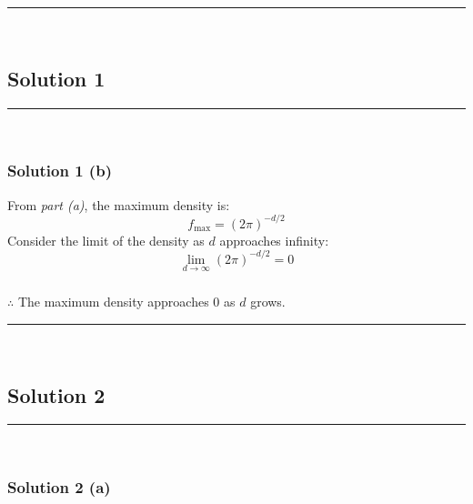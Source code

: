 \documentclass{article}
\begin{document}
\noindent\rule{\textwidth}{0.4pt}\\

\newpage

\subsection*{Solution 1}
\noindent\rule{\textwidth}{0.4pt}\\
\subsubsection*{Solution 1 (b)}
From \textit{part (a)}, the maximum density is:
$$f_{\text{max}} = (2\pi)^{-d/2}$$
Consider the limit of the density as $d$ approaches infinity:
$$ \lim_{d \to \infty} (2\pi)^{-d/2} = 0 $$

\subsubsection*{\normalfont}{$\therefore$ The maximum density approaches $0$ as $d$ grows.}

\noindent\rule{\textwidth}{0.4pt}\\

\newpage

\subsection*{Solution 2}
\noindent\rule{\textwidth}{0.4pt}\\
\subsubsection*{Solution 2 (a)}
\end{document}
